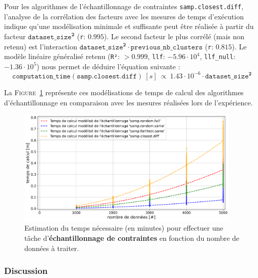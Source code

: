 			Pour les algorithmes de l'échantillonnage de contraintes \texttt{samp.closest.diff}, l'analyse de la corrélation des facteurs avec les mesures de temps d'exécution indique qu'une modélisation minimale et suffisante peut être réalisée à partir du facteur $\texttt{dataset\_size}^{\textbf{2}}$ (\texttt{r}: $0.995$).
			Le second facteur le plus corrélé (mais non retenu) est l'interaction $\texttt{dataset\_size}^{\textbf{2}} \cdot \texttt{previous\_nb\_clusters}$ (\texttt{r}: $0.815$).
			Le modèle linéaire généralisé retenu (\texttt{R²}: $> 0.999$, \texttt{llf}: $-5.96 \cdot 10^{4}$, \texttt{llf\_null}: $-1.36 \cdot 10^{5}$) nous permet de déduire l'équation suivante :
			\begin{equation}
				\texttt{computation\_time}(\texttt{samp.closest.diff})~[s]~
				\propto~1.43 \cdot 10^{-6} \cdot \texttt{dataset\_size}^{\textbf{2}}
			\end{equation}
			
			La \textsc{Figure~\ref{figure:4.3.2-ETUDE-COUTS-TEMPS-CALCUL-MODELISATION-SAMPLING}} représente ces modélisations de temps de calcul des algorithmes d'échantillonnage en comparaison avec les mesures réalisées lors de l'expérience.
			\newline
			\begin{figure}[!htb]
				\centering
				\includegraphics[width=0.95\textwidth]{figures/etude-temps-calcul-modelisation-4samp}
				\caption{
					Estimation du temps nécessaire (en minutes) pour effectuer une tâche d'\textbf{échantillonnage de contraintes} en fonction du nombre de données à traiter.
				}
				\label{figure:4.3.2-ETUDE-COUTS-TEMPS-CALCUL-MODELISATION-SAMPLING}
			\end{figure}

		\subsubsection{Discussion}
		
